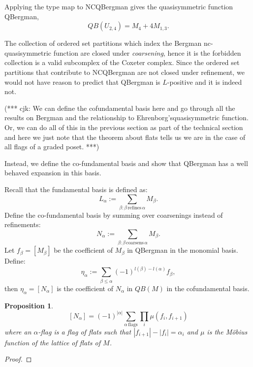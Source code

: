 \documentclass[12pt,reqno]{amsart}
\numberwithin{definition}{section}
\newtheorem{proposition}[definition]{Proposition}
\begin{document}
Applying the type map to NCQBergman gives the quasisymmetric
function QBergman, 
$$QB(U_{2,4}) = M_4 + 4M_{1,3}.$$


The collection of ordered set partitions which index the Bergman
nc-quasisymmetric function are closed under {\em coarsening}, hence it
is the forbidden collection is a valid subcomplex of the Coxeter
complex.  Since the ordered set partitions that contribute to
NCQBergman are not closed under refinement, we would not have reason
to predict that QBergman is $L$-positive and it is indeed not.


(*** cjk: We can define the cofundamental basis here and go through all the results on Bergman and the relationship to Ehrenborg'squasisymmetric function.  Or, we can do all of this in the previous section as part of the technical section and here we just note that the theorem about flats tells us we are in the case of all flags of a graded poset. ***) 

 Instead, we define the co-fundamental basis and show that QBergman
 has a well behaved expansion in this basis.

 


Recall that the fundamental basis is defined as:
$$ L_{\alpha} := \sum_{\beta : \beta \, \textrm{refines} \, \alpha} M_{\beta}.$$
Define the co-fundamental basis by summing over coarsenings instead of refinements:
$$ N_{\alpha} := \sum_{\beta : \beta \, \textrm{coarsens} \, \alpha} M_{\beta}.$$
Let $f_{\beta} = [M_{\beta}]$ be the coefficient of $M_{\beta}$ in
QBergman in the monomial basis.  Define: 
$$\eta_{\alpha} := \sum_{\beta \leq \alpha} (-1)^{l(\beta)-l(\alpha)}f_{\beta},$$
then $\eta_{\alpha} = [N_{\alpha}]$ is the coefficient of $N_{\alpha}$ in $QB(M)$ in the cofundamental basis.


\begin{proposition}
$$[N_{\alpha}] = (-1)^{|\alpha|} \sum_{\alpha \, \textrm{flags}} \prod_i \mu(f_i,f_{i+1})$$
where an $\alpha$-flag is a flag of flats such that $|f_{i+1}| - |f_i| = \alpha_i$ and $\mu$ is the M\"{o}bius function of the lattice of flats of $M$.
\end{proposition}

\begin{proof}
\end{proof}
\end{document}
